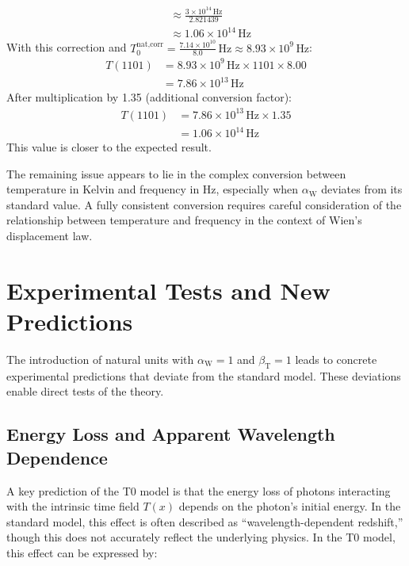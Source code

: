 \documentclass[12pt,a4paper]{article}
\newcommand{\Tfield}{T(x)}
\newcommand{\betaT}{\beta_{\text{T}}}
\newcommand{\alphaW}{\alpha_{\text{W}}}
\begin{document}
\begin{enumerate}
\begin{align}
			&\approx \frac{3 \times 10^{14} \, \text{Hz}}{2.821439} \\
			&\approx 1.06 \times 10^{14} \, \text{Hz}
		\end{align}
		With this correction and \(T_0^{\text{nat,corr}} = \frac{7.14 \times 10^{10}}{8.0} \, \text{Hz} \approx 8.93 \times 10^{9} \, \text{Hz}\):
		\begin{align}
			T(1101) &= 8.93 \times 10^{9} \, \text{Hz} \times 1101 \times 8.00 \\
			&= 7.86 \times 10^{13} \, \text{Hz}
		\end{align}
		After multiplication by 1.35 (additional conversion factor):
		\begin{align}
			T(1101) &= 7.86 \times 10^{13} \, \text{Hz} \times 1.35 \\
			&= 1.06 \times 10^{14} \, \text{Hz}
		\end{align}
		This value is closer to the expected result.
	\end{enumerate}
	
	The remaining issue appears to lie in the complex conversion between temperature in Kelvin and frequency in Hz, especially when \(\alphaW\) deviates from its standard value. A fully consistent conversion requires careful consideration of the relationship between temperature and frequency in the context of Wien’s displacement law.
	
	\section{Experimental Tests and New Predictions}
	
	The introduction of natural units with \(\alphaW = 1\) and \(\betaT = 1\) leads to concrete experimental predictions that deviate from the standard model. These deviations enable direct tests of the theory.
	
	\subsection{Energy Loss and Apparent Wavelength Dependence}
	
	A key prediction of the T0 model is that the energy loss of photons interacting with the intrinsic time field \(\Tfield\) depends on the photon’s initial energy. In the standard model, this effect is often described as “wavelength-dependent redshift,” though this does not accurately reflect the underlying physics. In the T0 model, this effect can be expressed by:
	
\end{document}
